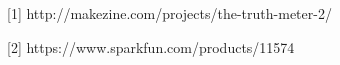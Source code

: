 \documentclass[finalProposal.tex]{subfiles}
\begin{document}
\onehalfspacing


\bigskip

[1] http://makezine.com/projects/the-truth-meter-2/ 

[2] https://www.sparkfun.com/products/11574
\end{document}
